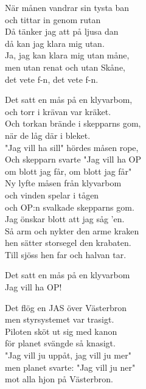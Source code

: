 \documentclass[a6paper, 10pt, twoside]{article}
\begin{document}
\noindent
\begin{center}
\end{center}
\begin{lyrics}
När månen vandrar sin tysta ban \\
och tittar in genom rutan \\
Då tänker jag att på ljusa dan \\
då kan jag klara mig utan. \\
Ja, jag kan klara mig utan måne, \\
men utan renat och utan Skåne, \\
det vete f-n, det vete f-n. 
\end{lyrics}
\begin{center}
\end{center}
\begin{lyrics}
Det satt en mås på en klyvarbom, \\
och torr i krävan var kräket. \\
Och torkan brände i skepparns gom, \\
när de låg där i bleket. \\
"Jag vill ha sill" hördes måsen rope, \\
Och skepparn svarte "Jag vill ha OP \\
om blott jag får, om blott jag får" 
\vspace{5pt}\\
Ny lyfte måsen från klyvarbom \\
och vinden spelar i tågen \\
och OP:n svalkade skepparns gom. \\
Jag önskar blott att jag såg 'en. \\
Så arm och nykter den arme kraken \\
hen sätter storsegel den krabaten. \\
Till sjöss hen far och halvan tar. 
\end{lyrics}

\begin{center}
\end{center}
\begin{lyrics}
Det satt en mås på en klyvarbom\\
Jag vill ha OP! 
\end{lyrics}

\newpage
\noindent
\begin{center}
\end{center}
\begin{lyrics}
Det flög en JAS över Västerbron \\
men styrsystemet var trasigt. \\
Piloten sköt ut sig med kanon \\
för planet svängde så knasigt. \\
"Jag vill ju uppåt, jag vill ju mer"\\
men planet svarte: "Jag vill ju ner"\\
mot alla hjon på Västerbron. 
\end{lyrics}
\end{document}
